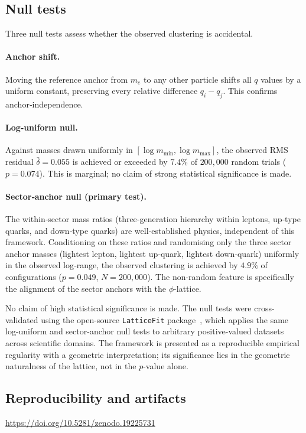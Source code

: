 \documentclass[12pt]{article}
\theoremstyle{definition}
\begin{document}
\subsection{Null tests}
Three null tests assess whether the observed clustering is accidental.

\paragraph{Anchor shift.}
Moving the reference anchor from $m_e$ to any other particle shifts all $q$ values by a uniform constant, preserving every relative difference $q_i - q_j$. This confirms anchor‑independence.

\paragraph{Log‑uniform null.}
Against masses drawn uniformly in $[\log m_{\min}, \log m_{\max}]$, the observed RMS residual $\bar\delta = 0.055$ is achieved or exceeded by $7.4\%$ of $200{,}000$ random trials ($p = 0.074$). This is marginal; no claim of strong statistical significance is made.

\paragraph{Sector‑anchor null (primary test).}
The within‑sector mass ratios (three‑generation hierarchy within leptons, up‑type quarks, and down‑type quarks) are well‑established physics, independent of this framework. Conditioning on these ratios and randomising only the three sector anchor masses (lightest lepton, lightest up‑quark, lightest down‑quark) uniformly in the observed log‑range, the observed clustering is achieved by $4.9\%$ of configurations ($p = 0.049$, $N = 200{,}000$). The non‑random feature is specifically the alignment of the sector anchors with the $\phi$-lattice.

No claim of high statistical significance is made. The null tests were cross-validated using the open-source \texttt{LatticeFit} package~\cite{Gentry:LatticeFit}, which applies the same log-uniform and sector-anchor null tests to arbitrary positive-valued datasets across scientific domains. The framework is presented as a reproducible empirical regularity with a geometric interpretation; its significance lies in the geometric naturalness of the lattice, not in the $p$-value alone.

\subsection{Reproducibility and artifacts}
  \url{https://doi.org/10.5281/zenodo.19225731}
\end{document}
